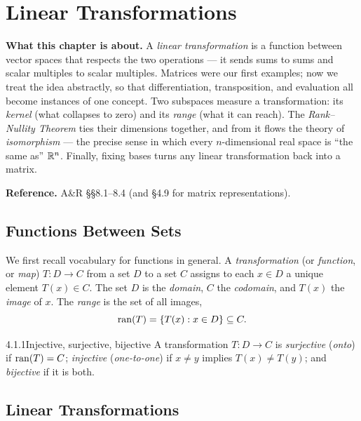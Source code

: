 \chapter{Linear Transformations}
\label{ch:linear-transformations}

\begin{roadmap}
\noindent\textbf{What this chapter is about.}\;
A \emph{linear transformation} is a function between vector spaces that respects the two operations --- it sends sums to sums and scalar multiples to scalar multiples. Matrices were our first examples; now we treat the idea abstractly, so that differentiation, transposition, and evaluation all become instances of one concept. Two subspaces measure a transformation: its \emph{kernel} (what collapses to zero) and its \emph{range} (what it can reach). The \emph{Rank--Nullity Theorem} ties their dimensions together, and from it flows the theory of \emph{isomorphism} --- the precise sense in which every $n$-dimensional real space is ``the same as'' $\mathbb{R}^n$. Finally, fixing bases turns any linear transformation back into a matrix.
\medskip

\noindent\textbf{Reference.}\; A\&R \S\S8.1--8.4 (and \S4.9 for matrix representations).
\end{roadmap}

\section{Functions Between Sets}
\label{sec:4.1}

We first recall vocabulary for functions in general. A \emph{transformation} (or \emph{function}, or \emph{map}) $T:D\to C$ from a set $D$ to a set $C$ assigns to each $x\in D$ a unique element $T(x)\in C$. The set $D$ is the \emph{domain}, $C$ the \emph{codomain}, and $T(x)$ the \emph{image} of $x$. The \emph{range} is the set of all images,
\[
\operatorname{ran}(T)=\{T(x):x\in D\}\subseteq C.
\]

\begin{defns}{4.1.1}{Injective, surjective, bijective}
A transformation $T:D\to C$ is \emph{surjective} (\emph{onto}) if $\operatorname{ran}(T)=C$; \emph{injective} (\emph{one-to-one}) if $x\neq y$ implies $T(x)\neq T(y)$; and \emph{bijective} if it is both.
\end{defns}

\section{Linear Transformations}
\label{sec:4.2}

